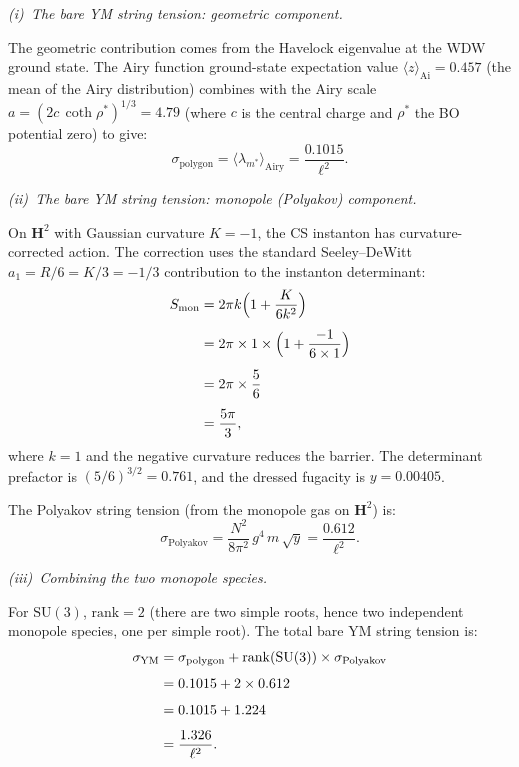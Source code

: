 \medskip\noindent
\emph{(i)~The bare YM string tension: geometric component.}

The geometric contribution comes from the Havelock eigenvalue
at the WDW ground state.
The Airy function ground-state expectation value
$\langle z \rangle_{\mathrm{Ai}} = 0.457$
(the mean of the Airy distribution)
combines with the Airy scale
$a = (2c\,\coth\rho^*)^{1/3} = 4.79$
(where $c$ is the central charge and $\rho^*$ the
BO potential zero) to give:
\begin{equation}\label{eq:supp-sigma-polygon}
  \sigma_{\mathrm{polygon}}
  = \langle\lambda_{m^*}\rangle_{\mathrm{Airy}}
  = \frac{0.1015}{\ell^2}.
\end{equation}

\medskip\noindent
\emph{(ii)~The bare YM string tension: monopole (Polyakov) component.}

On $\mathbf{H}^2$ with Gaussian curvature $K = -1$,
the CS instanton has curvature-corrected action.
The correction uses the standard Seeley--DeWitt
$a_1 = R/6 = K/3 = -1/3$ contribution to the instanton
determinant:
\begin{align}
  S_{\mathrm{mon}}
  &= 2\pi k\Bigl(1 + \frac{K}{6k^2}\Bigr)
  \notag \\[4pt]
  &= 2\pi \times 1 \times
     \Bigl(1 + \frac{-1}{6 \times 1}\Bigr)
  \notag \\[4pt]
  &= 2\pi \times \frac{5}{6}
  \notag \\[4pt]
  &= \frac{5\pi}{3},
  \label{eq:supp-smon}
\end{align}
where $k = 1$ and the negative curvature reduces the barrier.
The determinant prefactor is $(5/6)^{3/2} = 0.761$,
and the dressed fugacity is $y = 0.00405$.

The Polyakov string tension (from the monopole gas on $\mathbf{H}^2$)
is:
\begin{equation}\label{eq:supp-sigma-polyakov}
  \sigma_{\mathrm{Polyakov}}
  = \frac{N^2}{8\pi^2}\,g^4\,m\,\sqrt{y}
  = \frac{0.612}{\ell^2}.
\end{equation}

\medskip\noindent
\emph{(iii)~Combining the two monopole species.}

For $\mathrm{SU}(3)$, $\mathrm{rank} = 2$
(there are two simple roots, hence two independent monopole species,
one per simple root).
The total bare YM string tension is:
\begin{align}
  \sigma_{\mathrm{YM}}
  &= \sigma_{\mathrm{polygon}}
     + \mathrm{rank}(\mathrm{SU}(3))
       \times \sigma_{\mathrm{Polyakov}}
  \notag \\[4pt]
  &= 0.1015 + 2 \times 0.612
  \notag \\[4pt]
  &= 0.1015 + 1.224
  \notag \\[4pt]
  &= \frac{1.326}{\ell^2}.
  \label{eq:supp-sigma-ym}
\end{align}


